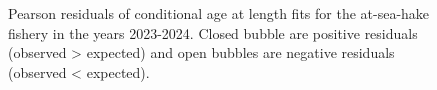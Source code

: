 \documentclass[
]{scrartcl}
\begin{document}
\begin{figure}[H]


\caption{\label{fig-peasrson-resids-age-ashop2}Pearson residuals of
conditional age at length fits for the at-sea-hake fishery in the years
2023-2024. Closed bubble are positive residuals (observed \textgreater{}
expected) and open bubbles are negative residuals (observed \textless{}
expected).}

\end{figure}%
\end{document}
